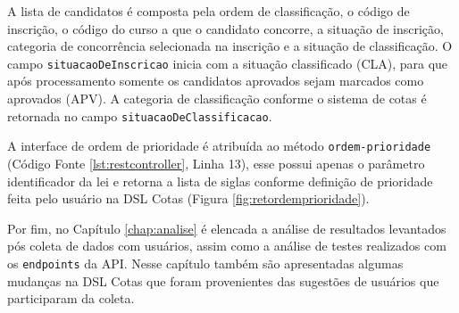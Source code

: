 A lista de candidatos é composta pela ordem de classificação, o código de inscrição, o código do curso a que o candidato concorre, a situação de inscrição, categoria de concorrência selecionada na inscrição e a situação de classificação. O campo \texttt{situacaoDeInscricao} inicia com a situação classificado (CLA), para que após processamento somente os candidatos aprovados sejam marcados como aprovados (APV). A categoria de classificação conforme o sistema de cotas é retornada no campo \texttt{situacaoDeClassificacao}.

\newpage
A interface de ordem de prioridade é atribuída ao método \texttt{ordem-prioridade} (Código Fonte \ref{lst:restcontroller}, Linha 13), esse possui apenas o parâmetro identificador da lei e retorna a lista de siglas conforme definição de prioridade feita pelo usuário na DSL Cotas (Figura \ref{fig:retordemprioridade}).



\newpage
Por fim, no Capítulo \ref{chap:analise} é elencada a análise de resultados levantados pós coleta de dados com usuários, assim como a análise de testes realizados com os \texttt{endpoints} da API. Nesse capítulo também são apresentadas algumas mudanças na DSL Cotas que foram provenientes das sugestões de usuários que participaram da coleta.